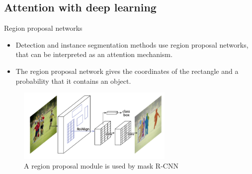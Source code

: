 \documentclass[xcolor=pdftex,dvipsnames,table,mathserif]{beamer}
\begin{document}







\subsection{Attention with deep learning}



\begin{frame}{Region proposal networks \cite{ren_faster_2015}}

  \begin{itemize}
  \item Detection and instance segmentation methods use region proposal networks, that can be interpreted as an attention mechanism.
  \item The region proposal network gives the coordinates of the rectangle and a probability that it contains an object.
  \end{itemize}


\begin{figure}
  \centering
  \includegraphics[width=7.5cm]{mask_r_cnn.png}\\
  \scriptsize{A region proposal module is used by mask R-CNN~\cite{he_mask_2017}}
  \end{figure}

\end{frame}
\end{document}
